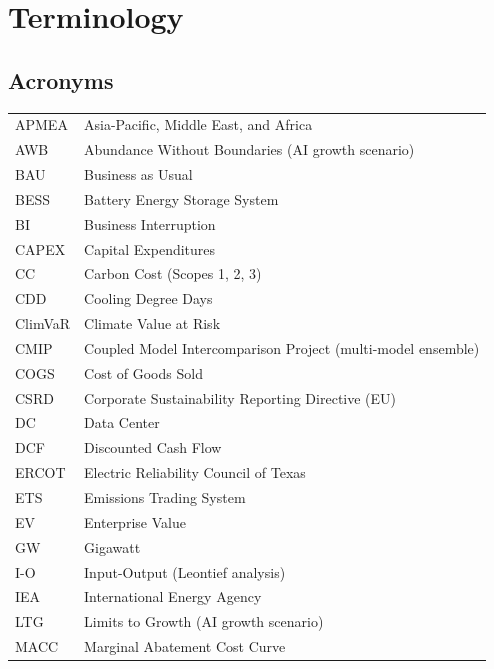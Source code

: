 
\clearpage
\section*{Terminology}\label{toc:terminology}

\subsection*{Acronyms}

\begin{tabular}{@{}p{3cm}p{11cm}@{}}
APMEA & Asia-Pacific, Middle East, and Africa \\
AWB & Abundance Without Boundaries (AI growth scenario) \\
BAU & Business as Usual \\
BESS & Battery Energy Storage System \\
BI & Business Interruption \\
CAPEX & Capital Expenditures \\
CC & Carbon Cost (Scopes 1, 2, 3) \\
CDD & Cooling Degree Days \\
ClimVaR & Climate Value at Risk \\
CMIP & Coupled Model Intercomparison Project (multi-model ensemble) \\
COGS & Cost of Goods Sold \\
CSRD & Corporate Sustainability Reporting Directive (EU) \\
DC & Data Center \\
DCF & Discounted Cash Flow \\
ERCOT & Electric Reliability Council of Texas \\
ETS & Emissions Trading System \\
EV & Enterprise Value \\
GW & Gigawatt \\
I-O & Input-Output (Leontief analysis) \\
IEA & International Energy Agency \\
LTG & Limits to Growth (AI growth scenario) \\
MACC & Marginal Abatement Cost Curve \\

\end{tabular}
